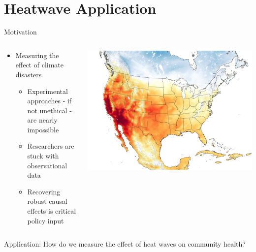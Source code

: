 \section{Heatwave Application}

\begin{frame}{Motivation}

  \begin{columns}
    \begin{column}{0.6\linewidth}
      \begin{itemize}
        \item Measuring the effect of climate disasters
            \begin{itemize}
            \item Experimental approaches - if not unethical - are nearly impossible
            \item Researchers are stuck with observational data
            \item Recovering robust causal effects is critical policy input
            \end{itemize}
      \end{itemize}
    \end{column}
    \begin{column}{0.4\linewidth}
      \includegraphics[scale=0.1]{figures/california-heatwave-2020-nasa-eo.jpeg}
      \caption{}
    \end{column}
  \end{columns}

\vspace{7pt}
\begin{center}
    Application: How do we measure the effect of heat waves on community health?
\end{center}


\end{frame}

